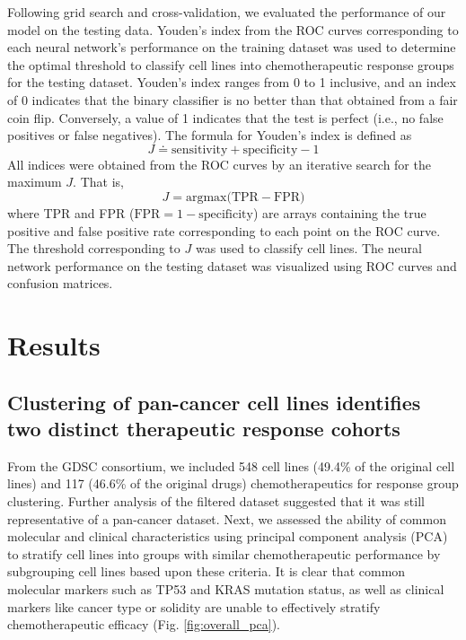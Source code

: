 \documentclass[10pt, letterpaper, twocolumn]{article}
\begin{document}
Following grid search and cross-validation, we evaluated the performance of our model on the testing data. Youden's index from the ROC curves corresponding to each neural network’s performance on the training dataset was used to determine the optimal threshold to classify cell lines into chemotherapeutic response groups for the testing dataset. Youden’s index ranges from 0 to 1 inclusive, and an index of 0 indicates that the binary classifier is no better than that obtained from a fair coin flip. Conversely, a value of 1 indicates that the test is perfect (i.e., no false positives or false negatives). The formula for Youden's index is defined as $$J \doteq \text{sensitivity} + \text{specificity} - 1$$ All indices were obtained from the ROC curves by an iterative search for the maximum $J$. That is, $$J = \text{argmax(TPR} - \text{FPR)}$$ where TPR and FPR ($\text{FPR} = 1 - \text{specificity}$) are arrays containing the true positive and false positive rate corresponding to each point on the ROC curve. The threshold corresponding to $J$ was used to classify cell lines. The neural network performance on the testing dataset was visualized using ROC curves and confusion matrices.


\section{Results}
\subsection{Clustering of pan-cancer cell lines identifies two distinct therapeutic response cohorts}
From the GDSC consortium, we included 548 cell lines (49.4\% of the original cell lines) and 117 (46.6\% of the original drugs) chemotherapeutics for response group clustering. Further analysis of the filtered dataset suggested that it was still representative of a pan-cancer dataset. Next, we assessed the ability of common molecular and clinical characteristics using principal component analysis (PCA) to stratify cell lines into groups with similar chemotherapeutic performance by subgrouping cell lines based upon these criteria. It is clear that common molecular markers such as TP53 and  KRAS mutation status, as well as clinical markers like cancer type or solidity are unable to effectively stratify chemotherapeutic efficacy (Fig. \ref{fig:overall_pca}).
\end{document}
